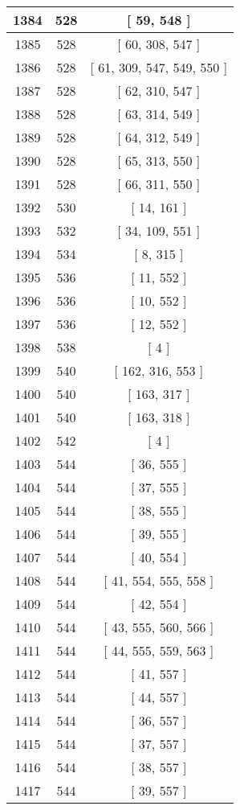 \begin{center}
\begin{longtable}[H]{|| c c c ||}
\hline
1384 & 528 & [ 59, 548 ] \\ 
\hline
1385 & 528 & [ 60, 308, 547 ] \\ 
\hline
1386 & 528 & [ 61, 309, 547, 549, 550 ] \\ 
\hline
1387 & 528 & [ 62, 310, 547 ] \\ 
\hline
1388 & 528 & [ 63, 314, 549 ] \\ 
\hline
1389 & 528 & [ 64, 312, 549 ] \\ 
\hline
1390 & 528 & [ 65, 313, 550 ] \\ 
\hline
1391 & 528 & [ 66, 311, 550 ] \\ 
\hline
1392 & 530 & [ 14, 161 ] \\ 
\hline
1393 & 532 & [ 34, 109, 551 ] \\ 
\hline
1394 & 534 & [ 8, 315 ] \\ 
\hline
1395 & 536 & [ 11, 552 ] \\ 
\hline
1396 & 536 & [ 10, 552 ] \\ 
\hline
1397 & 536 & [ 12, 552 ] \\ 
\hline
1398 & 538 & [ 4 ] \\ 
\hline
1399 & 540 & [ 162, 316, 553 ] \\ 
\hline
1400 & 540 & [ 163, 317 ] \\ 
\hline
1401 & 540 & [ 163, 318 ] \\ 
\hline
1402 & 542 & [ 4 ] \\ 
\hline
1403 & 544 & [ 36, 555 ] \\ 
\hline
1404 & 544 & [ 37, 555 ] \\ 
\hline
1405 & 544 & [ 38, 555 ] \\ 
\hline
1406 & 544 & [ 39, 555 ] \\ 
\hline
1407 & 544 & [ 40, 554 ] \\ 
\hline
1408 & 544 & [ 41, 554, 555, 558 ] \\ 
\hline
1409 & 544 & [ 42, 554 ] \\ 
\hline
1410 & 544 & [ 43, 555, 560, 566 ] \\ 
\hline
1411 & 544 & [ 44, 555, 559, 563 ] \\ 
\hline
1412 & 544 & [ 41, 557 ] \\ 
\hline
1413 & 544 & [ 44, 557 ] \\ 
\hline
1414 & 544 & [ 36, 557 ] \\ 
\hline
1415 & 544 & [ 37, 557 ] \\ 
\hline
1416 & 544 & [ 38, 557 ] \\ 
\hline
1417 & 544 & [ 39, 557 ] \\ 

\end{longtable}
\end{center}
